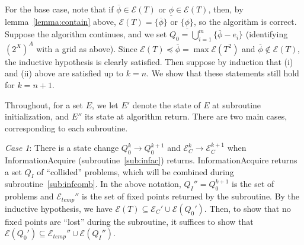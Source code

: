 \documentclass[11pt,reqno]{amsart}
\theoremstyle{definition}
\numberwithin{equation}{section}
\newcommand{\ol}{\overline}
\newcommand{\ul}{\underline}
\newcommand{\pre}{\phi}
\newcommand{\prealloc}{(2^X)^A}
\newcommand{\sub}{\subseteq}
\newcommand{\fix}{\mathcal{E}}
\newcommand{\peq}{\preceq}
\newcommand{\toppre}{\ol{\pre}}
\newcommand{\acto}{Q_0}
\newcommand{\actok}{Q_0^k}
\newcommand{\actc}{Q_I}
\newcommand{\fixfind}{\mathcal{E}_C}
\newcommand{\fixfindk}{\mathcal{E}^k_C}
\newcommand{\fixfindkk}{\mathcal{E}^{k + 1}_C}
\newcommand{\fixtemp}{\mathcal{E}_{temp}}
\begin{document}
For the base case, note that if $\toppre \in \fix(T)$ or $\ul{\pre} \in \fix(T)$, then, by lemma~\ref{lemma:contain} above, $\fix(T) = \{\toppre\}$ or $\{\ul{\pre}\}$, so the algorithm is correct. 
Suppose the algorithm continues, and we set $\acto = \bigcup_{i = 1}^m \{\toppre - e_i\}$ (identifying $\prealloc$ with a grid as above).
Since $\fix(T) \peq \toppre = \max \fix(T^2)$ and $\toppre \not \in \fix(T)$, the inductive hypothesis is clearly satisfied. 
Then suppose by induction that (i) and (ii) above are satisfied up to $k = n$.
We show that these statements still hold for $k = n +1$.

Throughout, for a set $E$, we let $E'$ denote the state of $E$ at subroutine initialization, and $E''$ its state at algorithm return.
There are two main cases, corresponding to each subroutine.

\emph{Case 1}: There is a state change $\actok \to \acto^{k +1}$ and $\fixfindk \to \fixfindkk$ when InformationAcquire (subroutine~\ref{sub:infac}) returns.
InformationAcquire returns a set $\actc$ of ``collided'' problems, which will be combined during subroutine~\ref{sub:infcomb}.
In the above notation, $\actc'' = \acto^{k+1}$ is the set of problems and $\fixtemp''$ is the set of fixed points returned by the subroutine.
By the inductive hypothesis, we have $\fix(T) \sub \fixfind' \cup \fix(\acto')$.
Then, to show that no fixed points are ``lost'' during the subroutine, it suffices to show that $\fix(\acto') \sub \fixtemp'' \cup \fix(\actc'')$.
\end{document}
